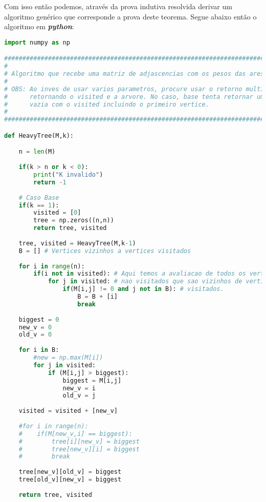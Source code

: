 \documentclass[paper=a4, fontsize=11pt]{scrartcl} %
\numberwithin{equation}{section} %
\numberwithin{figure}{section} %
\numberwithin{table}{section} %
\begin{document}
Com isso então podemos, através da prova indutiva resolvida derivar um algoritmo genérico que corresponde a prova deste teorema. Segue abaixo então o algoritmo em \emph{\textbf{python}}: \\

\begin{lstlisting}[language=Python, caption=Python algorithm]
import numpy as np

################################################################################
#
# Algoritmo que recebe uma matriz de adjascencias com os pesos das arestas
#
# OBS: Ao inves de usar varios parametros, procure usar o retorno multiplo,
#      retornando o visited e a arvore. No caso, base tenta retornar uma matriz
#      vazia com o visited incluindo o primeiro vertice.
#
################################################################################

def HeavyTree(M,k):

    n = len(M)
    
    if(k > n or k < 0):
        print("K invalido")
        return -1
    
    # Caso Base
    if(k == 1):
        visited = [0]
        tree = np.zeros((n,n))
        return tree, visited
    
    tree, visited = HeavyTree(M,k-1)
    B = [] # Vertices vizinhos a vertices visitados
    
    for i in range(n):
        if(i not in visited): # Aqui temos a avaliacao de todos os vertices
            for j in visited: # nao visitados que sao vizinhos de vertices 
                if(M[i,j] != 0 and j not in B): # visitados.
                    B = B + [i]
                    break
    
    biggest = 0
    new_v = 0
    old_v = 0
    
    for i in B:
        #new = np.max(M[i])
        for j in visited:
            if (M[i,j] > biggest):
                biggest = M[i,j]
                new_v = i
                old_v = j
    
    visited = visited + [new_v]
    
    #for i in range(n):
    #    if(M[new_v,i] == biggest):
    #        tree[i][new_v] = biggest
    #        tree[new_v][i] = biggest
    #        break
    
    tree[new_v][old_v] = biggest
    tree[old_v][new_v] = biggest
    
    return tree, visited
\end{lstlisting}
\end{document}
